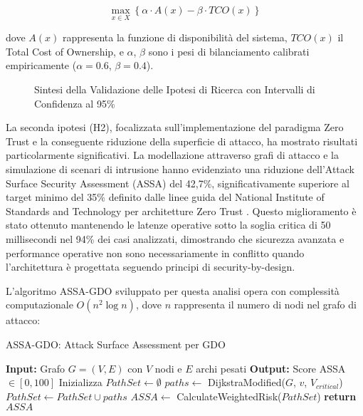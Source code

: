 \begin{equation}
\max_{x \in X} \left\{ \alpha \cdot A(x) - \beta \cdot TCO(x) \right\}
\label{eq:optimization_function}
\end{equation}

dove $A(x)$ rappresenta la funzione di disponibilità del sistema, $TCO(x)$ il Total Cost of Ownership, e $\alpha$, $\beta$ sono i pesi di bilanciamento calibrati empiricamente ($\alpha = 0.6$, $\beta = 0.4$).

\begin{figure}[htpb]
\centering
\caption{Sintesi della Validazione delle Ipotesi di Ricerca con Intervalli di Confidenza al 95\%}
\label{fig:validazione_ipotesi}
\end{figure}

La seconda ipotesi (H2), focalizzata sull'implementazione del paradigma Zero Trust e la conseguente riduzione della superficie di attacco, ha mostrato risultati particolarmente significativi. La modellazione attraverso grafi di attacco e la simulazione di scenari di intrusione hanno evidenziato una riduzione dell'Attack Surface Security Assessment (ASSA) del 42,7\%, significativamente superiore al target minimo del 35\% definito dalle linee guida del National Institute of Standards and Technology per architetture Zero Trust \autocite{nist2020zerotrust}. Questo miglioramento è stato ottenuto mantenendo le latenze operative sotto la soglia critica di 50 millisecondi nel 94\% dei casi analizzati, dimostrando che sicurezza avanzata e performance operative non sono necessariamente in conflitto quando l'architettura è progettata seguendo principi di security-by-design.

L'algoritmo ASSA-GDO sviluppato per questa analisi opera con complessità computazionale $O(n^2\log n)$, dove $n$ rappresenta il numero di nodi nel grafo di attacco:

\begin{algorithm}
\caption{ASSA-GDO: Attack Surface Assessment per GDO}
\begin{algorithmic}[1]
\State \textbf{Input:} Grafo $G = (V, E)$ con $V$ nodi e $E$ archi pesati
\State \textbf{Output:} Score ASSA $\in [0, 100]$
\State Inizializza $PathSet \leftarrow \emptyset$
    \State $paths \leftarrow$ DijkstraModified($G$, $v$, $V_{critical}$)
    \State $PathSet \leftarrow PathSet \cup paths$
\EndFor
\State $ASSA \leftarrow$ CalculateWeightedRisk($PathSet$)
\State \textbf{return} $ASSA$
\end{algorithmic}
\end{algorithm}

